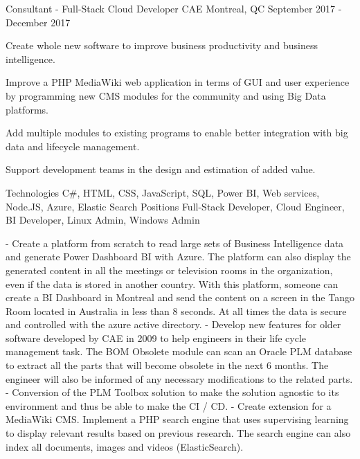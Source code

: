 \begin{cventries}
  \cventry
    {Consultant - Full-Stack Cloud Developer}
    {CAE}
    {Montreal, QC}
    {September 2017 - December 2017}
    {
      \begin{cvitems}
        \item {Create whole new software to improve business productivity and business intelligence.}
        \item {Improve a PHP MediaWiki web application in terms of GUI and user experience by programming new CMS modules for the community and using Big Data platforms.}
		\item {Add multiple modules to existing programs to enable better integration with big data and lifecycle management.}
		\item {Support development teams in the design and estimation of added value.}
		\vspace{2mm}
        \begin{cvskills}
          \cvskill
          {Technologies}
    	  {C\#, HTML, CSS, JavaScript, SQL, Power BI, Web services, Node.JS, Azure, Elastic Search}
    	  \cvskill
          {Positions}
    	  {Full-Stack Developer, Cloud Engineer, BI Developer, Linux Admin, Windows Admin}
        \end{cvskills}
		\begin{cvsubentries}
		{
		    - Create a platform from scratch to read large sets of Business Intelligence data and generate Power Dashboard BI with Azure. The platform can also display the generated content in all the meetings or television rooms in the organization, even if the data is stored in another country. With this platform, someone can create a BI Dashboard in Montreal and send the content on a screen in the Tango Room located in Australia in less than 8 seconds. At all times the data is secure and controlled with the azure active directory.
		}
		{
		    - Develop new features for older software developed by CAE in 2009 to help engineers in their life cycle management task. The BOM Obsolete module can scan an Oracle PLM database to extract all the parts that will become obsolete in the next 6 months. The engineer will also be informed of any necessary modifications to the related parts.\newline
            - Conversion of the PLM Toolbox solution to make the solution agnostic to its environment and thus be able to make the CI / CD.
		}
		{
		    - Create extension for a MediaWiki CMS. Implement a PHP search engine that uses supervising learning to display relevant results based on previous research. The search engine can also index all documents, images and videos (ElasticSearch).
		}
		\end{cvsubentries}
      \end{cvitems}
    }
	

\end{cventries}
